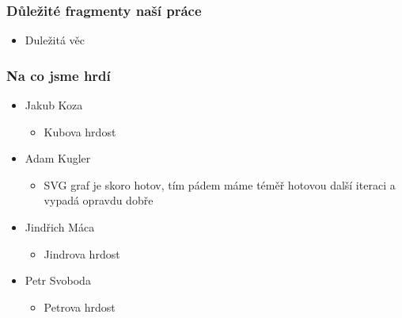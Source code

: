 \documentclass{beamer}
\begin{document}
\begin{frame}[allowframebreaks]\frametitle{Důležité fragmenty naší práce}
  \begin{itemize}
    \item Duležitá věc %
  \end{itemize}
\end{frame}

\begin{frame}[allowframebreaks]\frametitle{Na co jsme hrdí} 
  \begin{itemize}
    \item Jakub Koza
      \begin{itemize}
       \item Kubova hrdost
     \end{itemize}
   
    \item Adam Kugler
      \begin{itemize}
       \item SVG graf je skoro hotov, tím pádem máme téměř hotovou další iteraci a vypadá opravdu dobře
     \end{itemize}

    \item Jindřich Máca
      \begin{itemize}
       \item Jindrova hrdost
      \end{itemize}  
   
    \item Petr Svoboda
      \begin{itemize}
       \item Petrova hrdost
     \end{itemize}
   \end{itemize}  
\end{frame}
\end{document}
